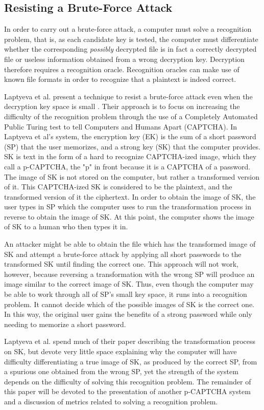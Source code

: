 \documentclass[12pt]{article}
\begin{document}
\subsection*{Resisting a Brute-Force Attack}
In order to carry out a brute-force attack, a computer must solve a recognition problem, that is, as each candidate key is tested, the computer must differentiate whether the corresponding \emph{possibly} decrypted file is in fact a correctly decrypted file or useless information obtained from a wrong decryption key. Decryption therefore requires a recognition oracle. Recognition oracles can make use of known file formats in order to recognize that a plaintext is indeed correct.

Laptyeva et al. present a technique to resist a brute-force attack even when the decryption key space is small \cite{laptyeva}. Their approach is to focus on increasing the difficulty of the recognition problem through the use of a Completely Automated Public Turing test to tell Computers and Humans Apart (CAPTCHA). In Laptyeva et al's system, the encryption key (EK) is the sum of a short password (SP) that the user memorizes, and a strong key (SK) that the computer provides. SK is text in the form of a hard to recognize CAPTCHA-ized image, which they call a p-CAPTCHA, the "p" in front because it is a CAPTCHA of a password. The image of SK is not stored on the computer, but rather a transformed version of it. This CAPTCHA-ized SK is considered to be the plaintext, and the transformed version of it the ciphertext. In order to obtain the image of SK, the user types in SP which the computer uses to run the transformation process in reverse to obtain the image of SK. At this point, the computer shows the image of SK to a human who then types it in.

An attacker might be able to obtain the file which has the transformed image of SK and attempt a brute-force attack by applying all short passwords to the transformed SK until finding the correct one. This approach will not work, however, because reversing a transformation with the wrong SP will produce an image similar to the correct image of SK. Thus, even though the computer may be able to work through all of SP's small key space, it runs into a recognition problem. It cannot decide which of the possible images of SK is the correct one. In this way, the original user gains the benefits of a strong password while only needing to memorize a short password.

Laptyeva et al. spend much of their paper describing the transformation process on SK, but devote very little space explaining why the computer will have difficulty differentiating a true image of SK, as produced by the correct SP, from a spurious one obtained from the wrong SP, yet the strength of the system depends on the difficulty of solving this recognition problem. The remainder of this paper will be devoted to the presentation of another p-CAPTCHA system and a discussion of metrics related to solving a recognition problem.
\end{document}
